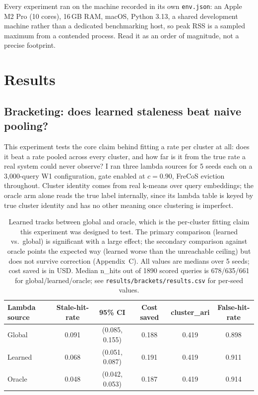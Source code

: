 \documentclass[10pt]{article}
\begin{document}
Every experiment ran on the machine recorded in its own \texttt{env.json}: an Apple M2 Pro
(10 cores), 16\,GB RAM, macOS, Python 3.13, a shared development machine rather than a
dedicated benchmarking host, so peak RSS is a sampled maximum from a contended process. Read
it as an order of magnitude, not a precise footprint.

\section{Results}
\label{sec:results}

\subsection{Bracketing: does learned staleness beat naive pooling?}
\label{sec:brackets}

This experiment tests the core claim behind fitting a rate per cluster at all: does it beat a
rate pooled across every cluster, and how far is it from the true rate a real system could
never observe? I ran three lambda sources for 5 seeds each on a 3{,}000-query W1
configuration, gate enabled at $c=0.90$, FreCoS eviction throughout. Cluster identity comes
from real k-means over query embeddings; the oracle arm alone reads the true label
internally, since its lambda table is keyed by true cluster identity and has no other
meaning once clustering is imperfect.

\begin{table}[H]
\centering
\caption{Learned tracks between global and oracle, which is the per-cluster fitting claim
this experiment was designed to test. The primary comparison (learned vs.\ global) is
significant with a large effect; the secondary comparison against oracle points the
expected way (learned worse than the unreachable ceiling) but does not survive correction
(Appendix~C). All values are medians over 5 seeds; cost saved is in USD. Median n\_hits out
of 1890 scored queries is 678/635/661 for global/learned/oracle; see
\texttt{results/brackets/results.csv} for per-seed values.}
\label{tab:brackets}
\small
\begin{tabular}{lccccc}
\toprule
Lambda source & Stale-hit-rate & 95\% CI & Cost saved & cluster\_ari & False-hit-rate \\
\midrule
Global & 0.091 & (0.085, 0.155) & 0.188 & 0.419 & 0.898 \\
Learned & 0.068 & (0.051, 0.087) & 0.191 & 0.419 & 0.911 \\
Oracle & 0.048 & (0.042, 0.053) & 0.187 & 0.419 & 0.914 \\
\bottomrule
\end{tabular}
\end{table}
\end{document}
